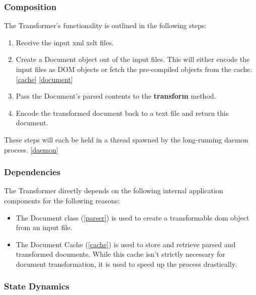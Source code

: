 \subsubsection{Composition}

The Transformer's functionality is outlined in the following steps:

\begin{enumerate}
  \item Receive the input \gls{xml} \gls{xslt} files.
  \item Create a Document object out of the input files. This will either encode the input files as DOM objects or fetch the pre-compiled objects from the cache. \ref{cache} \ref{document}
  \item Pass the Document's parsed contents to the \cite{xalan-library} \textbf{transform} method.
  \item Encode the transformed document back to a text file and return this document.
\end{enumerate}

These steps will each be held in a thread spawned by the long-running daemon process. \ref{daemon}

\subsubsection{Dependencies}

The Transformer directly depends on the following internal application components for the following reasons:

\begin{itemize}
  \item {
      The Document class (\ref{parser}) is used to create a transformable \gls{dom} object from an input file. \cite{dom-spec}
  }
  \item {
    The Document Cache (\ref{cache}) is used to store and retrieve parsed and transformed documents.
    While this cache isn't strictly necessary for document transformation, it is used to speed up the process drastically.
  }
\end{itemize}

\subsubsection{State Dynamics}

